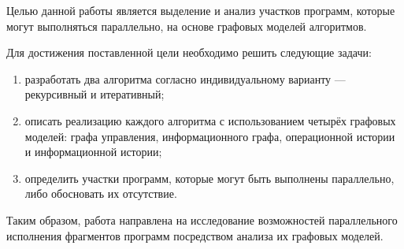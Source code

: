 
Целью данной работы является выделение и анализ участков программ, которые могут выполняться параллельно, на основе графовых моделей алгоритмов.  

Для достижения поставленной цели необходимо решить следующие задачи:

\begin{enumerate}
	\item разработать два алгоритма согласно индивидуальному варианту --- рекурсивный и итеративный;
	\item описать реализацию каждого алгоритма с использованием четырёх графовых моделей: графа управления, информационного графа, операционной истории и информационной истории;
	\item определить участки программ, которые могут быть выполнены параллельно, либо обосновать их отсутствие.
\end{enumerate}

Таким образом, работа направлена на исследование возможностей параллельного исполнения фрагментов программ посредством анализа их графовых моделей.
